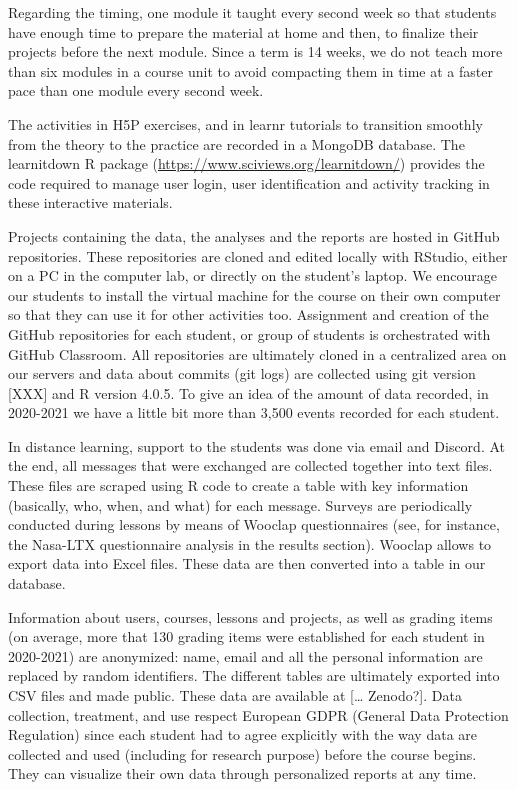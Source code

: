 \documentclass[
]{article}
\begin{document}
Regarding the timing, one module it taught every second week so that
students have enough time to prepare the material at home and then, to
finalize their projects before the next module. Since a term is 14
weeks, we do not teach more than six modules in a course unit to avoid
compacting them in time at a faster pace than one module every second
week.

The activities in H5P exercises, and in learnr tutorials to transition
smoothly from the theory to the practice are recorded in a MongoDB
database. The learnitdown R package
(\url{https://www.sciviews.org/learnitdown/}) provides the code required
to manage user login, user identification and activity tracking in these
interactive materials.

Projects containing the data, the analyses and the reports are hosted in
GitHub repositories. These repositories are cloned and edited locally
with RStudio, either on a PC in the computer lab, or directly on the
student's laptop. We encourage our students to install the virtual
machine for the course on their own computer so that they can use it for
other activities too. Assignment and creation of the GitHub repositories
for each student, or group of students is orchestrated with GitHub
Classroom. All repositories are ultimately cloned in a centralized area
on our servers and data about commits (git logs) are collected using git
version {[}XXX{]} and R version 4.0.5. To give an idea of the amount of
data recorded, in 2020-2021 we have a little bit more than 3,500 events
recorded for each student.

In distance learning, support to the students was done via email and
Discord. At the end, all messages that were exchanged are collected
together into text files. These files are scraped using R code to create
a table with key information (basically, who, when, and what) for each
message. Surveys are periodically conducted during lessons by means of
Wooclap questionnaires (see, for instance, the Nasa-LTX questionnaire
analysis in the results section). Wooclap allows to export data into
Excel files. These data are then converted into a table in our database.

Information about users, courses, lessons and projects, as well as
grading items (on average, more that 130 grading items were established
for each student in 2020-2021) are anonymized: name, email and all the
personal information are replaced by random identifiers. The different
tables are ultimately exported into CSV files and made public. These
data are available at {[}\ldots{} Zenodo?{]}. Data collection,
treatment, and use respect European GDPR (General Data Protection
Regulation) since each student had to agree explicitly with the way data
are collected and used (including for research purpose) before the
course begins. They can visualize their own data through personalized
reports at any time.
\end{document}
